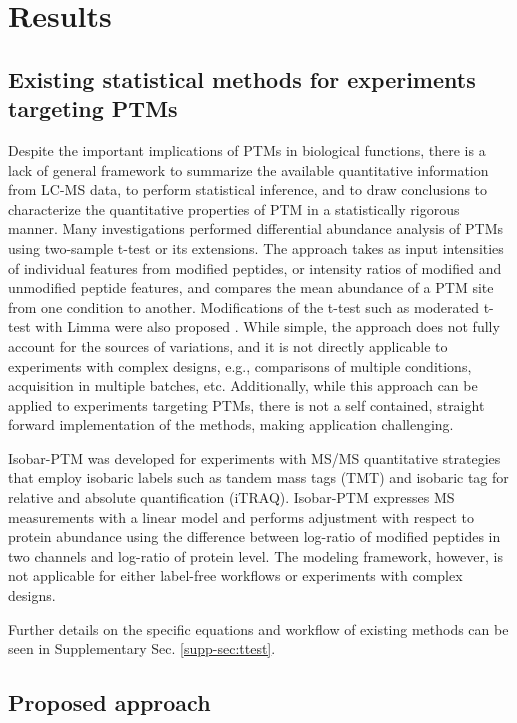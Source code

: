 \documentclass[mcp]{article}
\numberwithin{table}{section}
\begin{document}
\section*{Results}

\subsection*{Existing statistical methods for experiments targeting PTMs}

Despite the important implications of PTMs in biological functions, there is a lack of general framework to summarize the available quantitative information from LC-MS data, to perform statistical inference, and to draw conclusions to characterize the quantitative properties of PTM in a statistically rigorous manner. Many investigations performed differential abundance analysis of PTMs using two-sample t-test or its extensions. The approach takes as input intensities of individual features from modified peptides, or intensity ratios of modified and unmodified peptide features, and compares the mean abundance of a PTM site from one condition to another. Modifications of the t-test such as moderated t-test with Limma were also proposed \cite{Zhu}. While simple, the approach does not fully account for the sources of variations, and it is not directly applicable to experiments with complex designs, e.g., comparisons of multiple conditions, acquisition in multiple batches, etc. Additionally, while this approach can be applied to experiments targeting PTMs, there is not a self contained, straight forward implementation of the methods, making application challenging. 

Isobar-PTM was developed for experiments with MS/MS quantitative strategies that employ isobaric labels such as tandem mass tags (TMT) and isobaric tag for relative and absolute quantification (iTRAQ)\cite{Breitwieser:2013}. Isobar-PTM expresses MS measurements with a linear model and performs adjustment with respect to protein abundance using the difference between log-ratio of modified peptides in two channels and log-ratio of protein level. The modeling framework, however, is not applicable for either label-free workflows or experiments with complex designs. 

Further details on the specific equations and workflow of existing methods can be seen in Supplementary Sec. \ref{supp-sec:ttest}.

\subsection*{Proposed approach}
\end{document}
